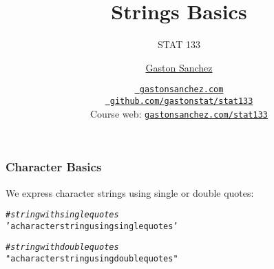 \documentclass[12pt]{beamer}\usepackage[]{graphicx}\usepackage[]{color}
\title{Strings Basics}
\subtitle{STAT 133}
\author{\href{http://www.gastonsanchez.com}{Gaston Sanchez}}
\institute{Department of Statistics, UC{\textendash}Berkeley}
\date{\href{http://www.gastonsanchez.com}{\tt \scriptsize \color{foreground} gastonsanchez.com}
\\[-4pt]
\href{http://github.com/gastonstat/stat133}{\tt \scriptsize \color{foreground} github.com/gastonstat/stat133}
\\[-4pt]
{\scriptsize Course web: \href{http://www.gastonsanchez.com/stat133}{\tt gastonsanchez.com/stat133}}
}
\makeatletter
\newcommand{\hlstr}[1]{\textcolor[rgb]{0.192,0.494,0.8}{#1}}%
\newcommand{\hlcom}[1]{\textcolor[rgb]{0.678,0.584,0.686}{\textit{#1}}}%
\newenvironment{kframe}{%
 \def\at@end@of@kframe{}%
 \ifinner\ifhmode%
  \def\at@end@of@kframe{\end{minipage}}%
  \begin{minipage}{\columnwidth}%
 \fi\fi%
 \def\FrameCommand##1{\hskip\@totalleftmargin \hskip-\fboxsep
 \colorbox{shadecolor}{##1}\hskip-\fboxsep
     \hskip-\linewidth \hskip-\@totalleftmargin \hskip\columnwidth}%
 \MakeFramed {\advance\hsize-\width
   \@totalleftmargin\z@ \linewidth\hsize
   \@setminipage}}%
 {\par\unskip\endMakeFramed%
 \at@end@of@kframe}
\newenvironment{knitrout}{}{} %
\makeatother
\begin{document}
{
  \frame{
    \titlepage
  } 
}


\begin{frame}
\begin{center}
\Huge{}
\end{center}
\end{frame}


\begin{frame}[fragile]
\frametitle{Character Basics}

We express character strings using single or double quotes:
\begin{knitrout}\footnotesize
{}\color{fgcolor}\begin{kframe}
\begin{alltt}
\hlcom{# string with single quotes}
\hlstr{'a character string using single quotes'}
\end{alltt}
\end{kframe}
\end{knitrout}

\begin{knitrout}\footnotesize
{}\color{fgcolor}\begin{kframe}
\begin{alltt}
\hlcom{# string with double quotes}
\hlstr{"a character string using double quotes"}
\end{alltt}
\end{kframe}
\end{knitrout}

\end{frame}

\end{document}
